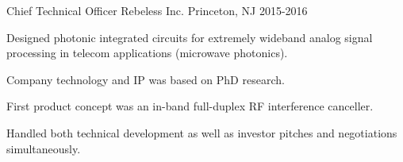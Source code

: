 \begin{cventries}
  \cventry
    {Chief Technical Officer} %
    {Rebeless Inc.}
    {Princeton, NJ} %
    {2015-2016} %
    {
      \begin{cvitems} %
        \item {Designed photonic integrated circuits for extremely wideband analog signal processing in telecom applications (microwave photonics).}
        \item {Company technology and IP was based on PhD research.}
        \item {First product concept was an in-band full-duplex RF interference canceller.}
        \item {Handled both technical development as well as investor pitches and negotiations simultaneously.}
      \end{cvitems}
    }

\end{cventries}
